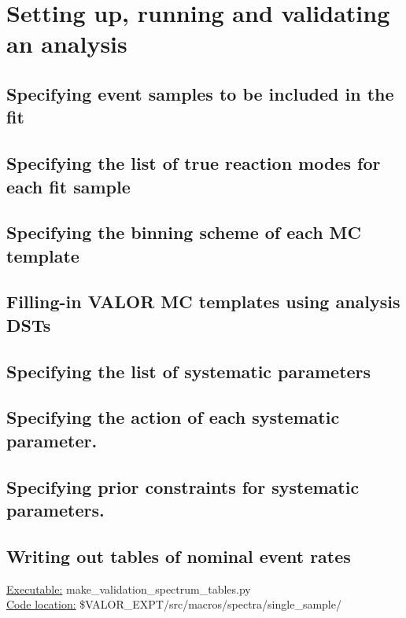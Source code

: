 
\section{Setting up, running and validating an analysis}
\label{sec:run analysis}


\subsection{
 Specifying event samples to be included in the fit
}

\subsection{
 Specifying the list of true reaction modes for each fit sample
}

\subsection{
 Specifying the binning scheme of each MC template
}

\subsection{
 Filling-in VALOR MC templates using analysis DSTs
}

\subsection{
 Specifying the list of systematic parameters
}

\subsection{
 Specifying the action of each systematic parameter.
}

\subsection{
 Specifying prior constraints for systematic parameters.
}


\subsection{
 Writing out tables of nominal event rates
}

\underline{Executable:} make\_validation\_spectrum\_tables.py\\

\underline{Code location:} \$VALOR\_EXPT/src/macros/spectra/single\_sample/\\

